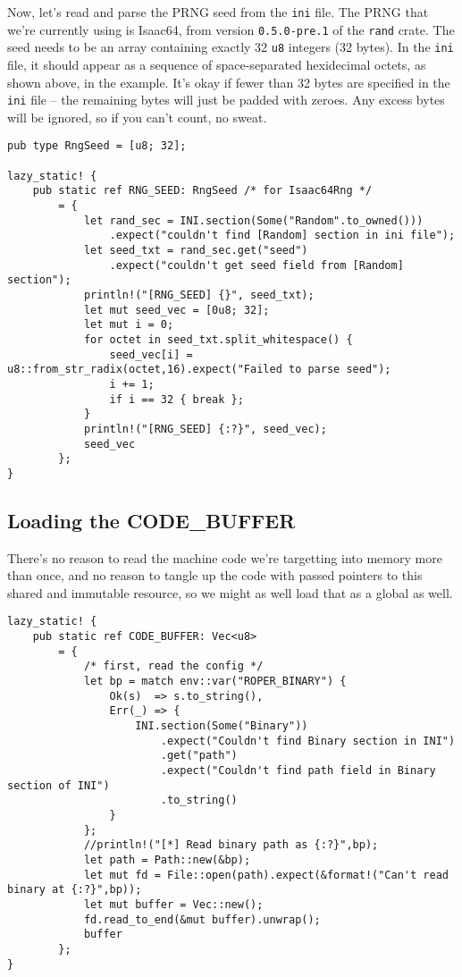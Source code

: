 \documentclass[11pt]{article}
\begin{document}
Now, let's read and parse the PRNG seed from the \texttt{ini} file. The PRNG
that we're currently using is Isaac64, from version \texttt{0.5.0-pre.1} of
the \texttt{rand} crate. The seed needs to be an array containing exactly 32 \texttt{u8}
integers (32 bytes). In the \texttt{ini} file, it should appear as a sequence of
space-separated hexidecimal octets, as shown above, in the example. It's
okay if fewer than 32 bytes are specified in the \texttt{ini} file -- the remaining
bytes will just be padded with zeroes. Any excess bytes will be ignored,
so if you can't count, no sweat.

\lstset{language=rust,label=orgd0ebb7b,caption= ,captionpos=b,numbers=none}
\begin{lstlisting}
pub type RngSeed = [u8; 32];

lazy_static! {
    pub static ref RNG_SEED: RngSeed /* for Isaac64Rng */
        = {
            let rand_sec = INI.section(Some("Random".to_owned()))
                .expect("couldn't find [Random] section in ini file");
            let seed_txt = rand_sec.get("seed")
                .expect("couldn't get seed field from [Random] section");
            println!("[RNG_SEED] {}", seed_txt);
            let mut seed_vec = [0u8; 32];
            let mut i = 0;
            for octet in seed_txt.split_whitespace() {
                seed_vec[i] = u8::from_str_radix(octet,16).expect("Failed to parse seed");
                i += 1;
                if i == 32 { break };
            }
            println!("[RNG_SEED] {:?}", seed_vec);
            seed_vec
        };
}
\end{lstlisting}

\subsection{Loading the CODE\_BUFFER}
\label{sec:org86f9fa8}

There's no reason to read the machine code we're targetting into memory
more than once, and no reason to tangle up the code with passed pointers
to this shared and immutable resource, so we might as well load that as
a global as well.
\lstset{language=rust,label=orgab0bde3,caption= ,captionpos=b,numbers=none}
\begin{lstlisting}
lazy_static! {
    pub static ref CODE_BUFFER: Vec<u8>
        = {
            /* first, read the config */
            let bp = match env::var("ROPER_BINARY") {
                Ok(s)  => s.to_string(),
                Err(_) => {
                    INI.section(Some("Binary"))
                        .expect("Couldn't find Binary section in INI")
                        .get("path")
                        .expect("Couldn't find path field in Binary section of INI")
                        .to_string()
                }
            };
            //println!("[*] Read binary path as {:?}",bp);
            let path = Path::new(&bp);
            let mut fd = File::open(path).expect(&format!("Can't read binary at {:?}",bp));
            let mut buffer = Vec::new();
            fd.read_to_end(&mut buffer).unwrap();
            buffer
        };
}
\end{lstlisting}
\end{document}
